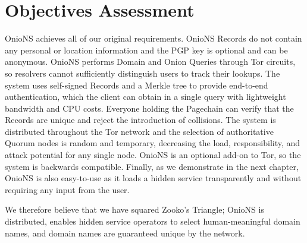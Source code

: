 






\section{Objectives Assessment}

OnioNS achieves all of our original requirements. OnioNS Records do not contain any personal or location information and the PGP key is optional and can be anonymous. OnioNS performs Domain and Onion Queries through Tor circuits, so resolvers cannot sufficiently distinguish users to track their lookups. The system uses self-signed Records and a Merkle tree to provide end-to-end authentication, which the client can obtain in a single query with lightweight bandwidth and CPU costs. Everyone holding the Pagechain can verify that the Records are unique and reject the introduction of collisions. The system is distributed throughout the Tor network and the selection of authoritative Quorum nodes is random and temporary, decreasing the load, responsibility, and attack potential for any single node. OnioNS is an optional add-on to Tor, so the system is backwards compatible. Finally, as we demonstrate in the next chapter, OnioNS is also easy-to-use as it loads a hidden service transparently and without requiring any input from the user.

We therefore believe that we have squared Zooko's Triangle; OnioNS is distributed, enables hidden service operators to select human-meaningful domain names, and domain names are guaranteed unique by the network.
